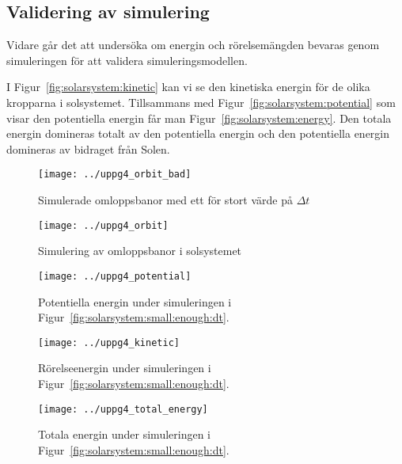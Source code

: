 \documentclass[a4]{article}
\begin{document}
		\subsection{Validering av simulering}
Vidare går det att undersöka om energin och rörelsemängden
bevaras genom simuleringen för att validera
simuleringsmodellen.

I Figur~\vref{fig:solarsystem:kinetic} kan vi se den kinetiska energin för de olika kropparna i solsystemet.
Tillsammans med Figur~\vref{fig:solarsystem:potential} som visar den potentiella energin får man 
Figur~\vref{fig:solarsystem:energy}.
Den totala energin domineras totalt av den potentiella energin och den potentiella energin domineras av bidraget från Solen.
\begin{figure}
\begin{center}
	\texttt{[image: ../uppg4\_orbit\_bad]}
\end{center}
\caption{Simulerade omloppsbanor med ett för stort värde på $\Delta t$}
\label{fig:solarsystem:large:dt}
\end{figure}

\begin{figure}
\begin{center}
	\texttt{[image: ../uppg4\_orbit]}
\end{center}
\caption{Simulering av omloppsbanor i solsystemet}
\label{fig:solarsystem:small:enough:dt}
\end{figure}

\begin{figure}
\begin{center}
	\texttt{[image: ../uppg4\_potential]}
\end{center}
\caption{Potentiella energin under simuleringen i Figur~\vref{fig:solarsystem:small:enough:dt}.}
\label{fig:solarsystem:potential}
\end{figure}

\begin{figure}
\begin{center}
	\texttt{[image: ../uppg4\_kinetic]}
\end{center}
\caption{Rörelseenergin under simuleringen i Figur~\vref{fig:solarsystem:small:enough:dt}.}
\label{fig:solarsystem:kinetic}
\end{figure}

\begin{figure}
\begin{center}
	\texttt{[image: ../uppg4\_total\_energy]}
\end{center}
\caption{Totala energin under simuleringen i Figur~\vref{fig:solarsystem:small:enough:dt}.}
\label{fig:solarsystem:energy}
\end{figure}
\end{document}
